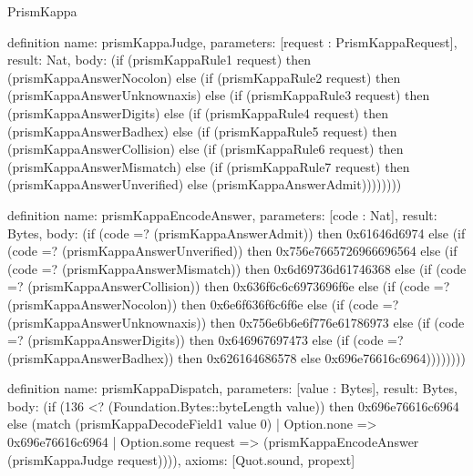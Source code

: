 \begin{lexlean}{PrismKappa}
\begin{semanticmodule}
definition{
  name: prismKappaJudge,
  parameters: [request : PrismKappaRequest],
  result: Nat,
  body: (if (prismKappaRule1 request) then (prismKappaAnswerNocolon) else (if (prismKappaRule2 request) then (prismKappaAnswerUnknownaxis) else (if (prismKappaRule3 request) then (prismKappaAnswerDigits) else (if (prismKappaRule4 request) then (prismKappaAnswerBadhex) else (if (prismKappaRule5 request) then (prismKappaAnswerCollision) else (if (prismKappaRule6 request) then (prismKappaAnswerMismatch) else (if (prismKappaRule7 request) then (prismKappaAnswerUnverified) else (prismKappaAnswerAdmit))))))))
}

definition{
  name: prismKappaEncodeAnswer,
  parameters: [code : Nat],
  result: Bytes,
  body: (if (code =? (prismKappaAnswerAdmit)) then 0x61646d6974 else (if (code =? (prismKappaAnswerUnverified)) then 0x756e7665726966696564 else (if (code =? (prismKappaAnswerMismatch)) then 0x6d69736d61746368 else (if (code =? (prismKappaAnswerCollision)) then 0x636f6c6c6973696f6e else (if (code =? (prismKappaAnswerNocolon)) then 0x6e6f636f6c6f6e else (if (code =? (prismKappaAnswerUnknownaxis)) then 0x756e6b6e6f776e61786973 else (if (code =? (prismKappaAnswerDigits)) then 0x646967697473 else (if (code =? (prismKappaAnswerBadhex)) then 0x626164686578 else 0x696e76616c6964))))))))
}

definition{
  name: prismKappaDispatch,
  parameters: [value : Bytes],
  result: Bytes,
  body: (if (136 <? (Foundation.Bytes::byteLength value)) then 0x696e76616c6964 else (match (prismKappaDecodeField1 value 0)
    | Option.none => 0x696e76616c6964
    | Option.some request => (prismKappaEncodeAnswer (prismKappaJudge request)))),
  axioms: [Quot.sound, propext]
}
\end{semanticmodule}
\end{lexlean}
